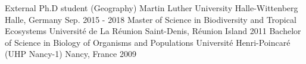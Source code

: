 

\begin{cventries}

  \cventry
    {External Ph.D student (Geography)} %
    {Martin Luther University Halle-Wittenberg} %
    {Halle, Germany} %
    {Sep. 2015 - 2018} %
      {}
     \vspace{-.5\baselineskip} 
\cventry
    {Master of Science in Biodiversity and Tropical Ecosystems} %
    {Université de La Réunion} %
    {Saint-Denis, Réunion Island} %
    {2011} %
        {}
      \vspace{-.5\baselineskip}  
\cventry
    {Bachelor of Science in Biology of Organisms and Populations} %
    {Université Henri-Poincaré (UHP Nancy-1)} %
    {Nancy, France} %
    {2009} %
        {}
 \vspace{-.5\baselineskip}
\end{cventries}
